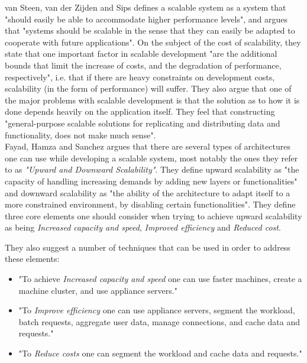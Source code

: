 \documentclass{article}
\begin{document}
van Steen, van der Zijden and Sips\cite{van1998software} defines a scalable
system as a system that "should easily be able to accommodate higher
performance levels", and argues that "systems should be scalable in the sense
that they can easily be adapted to cooperate with future applications".  On the
subject of the cost of scalability, they state that one important factor in
scalable development "are the additional bounds that limit the increase of
costs, and the degradation of performance, respectively", i.e. that if there
are heavy constraints on development costs, scalability (in the form of
performance) will suffer.  They also argue that one of the major problems with
scalable development is that the solution as to how it is done depends heavily
on the application itself.  They feel that constructing "general-purpose
scalable solutions for replicating and distributing data and functionality,
does not make much sense".
\\

Fayad, Hamza and Sanchez \cite{fayad2005towards} argues that there are several
types of architectures one can use while developing a scalable system, most
notably the ones they refer to as \emph{"Upward and Downward Scalability"}.
They define upward scalability as "the capacity of handling increasing demands
by adding new layers or functionalities" and downward scalability as "the
ability of the architecture to adapt itself to a more constrained environment,
by disabling certain functionalities".
They define three core elements one should consider when trying to achieve
upward scalability as being \emph{Increased capacity and speed}, \emph{Improved
efficiency} and \emph{Reduced cost}. 

They also suggest a number of techniques that can be used in order to address
these elements: 
\begin{itemize}
\item{"To achieve \emph{Increased capacity and speed} one can use faster
machines, create a machine cluster, and use appliance servers."} 
\item{"To \emph{Improve efficiency} one can use appliance servers, segment the
workload, batch requests, aggregate user data, manage connections, and cache
data and requests."}  
\item{"To \emph{Reduce costs} one can segment the workload and cache data and
requests."}
\end{itemize}
\end{document}
